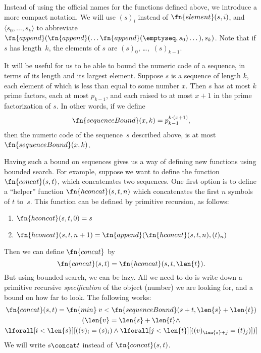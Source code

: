 \documentclass[../../include/open-logic-section]{subfiles}
\begin{document}
Instead of using the official names for the functions defined above,
we introduce a more compact notation.  We will use $(s)_i$ instead of
$\fn{element}(s,i)$, and $\langle s_0, \dots, s_k\rangle$ to abbreviate
$\fn{append}(\fn{append}(\dots \fn{append}(\emptyseq,s_0)
\dots),s_k)$. Note that if $s$ has length~$k$, the elements of $s$ are
$(s)_0$, \dots,~$(s)_{k-1}$.

It will be useful for us to be able to bound the numeric code of a
sequence, in terms of its length and its largest element. Suppose $s$
is a sequence of length $k$, each element of which is less than equal
to some number $x$. Then $s$ has at most $k$ prime factors, each at
most $p_{k-1}$, and each raised to at most $x+1$ in the prime
factorization of $s$. In other words, if we define
\[
\fn{sequenceBound}(x,k) = p_{k-1}^{k \cdot (x+1)},
\]
then the numeric code of the sequence~$s$ described above, is at
most~$\fn{sequenceBound}(x,k)$.

Having such a bound on sequences gives us a way of defining new
functions using bounded search. For example, suppose we want to
define the function $\fn{concat}(s,t)$, which concatenates two
sequences. One first option is to define a ``helper'' function
$\fn{hconcat}(s,t,n)$ which concatenates the first $n$ symbols of $t$
to~$s$. This function can be defined by primitive recursion, as
follows:
\begin{enumerate}
\item $\fn{hconcat}(s,t,0) = s$
\item $\fn{hconcat}(s,t,n+1) = \fn{append}(\fn{hconcat}(s,t,n),(t)_n)$
\end{enumerate}
Then we can define $\fn{concat}$ by 
\[
\fn{concat}(s,t) = \fn{hconcat}(s,t,\len{t}).
\]
But using bounded search, we can be lazy. All we need to do is write
down a primitive recursive \emph{specification} of the object (number)
we are looking for, and a bound on how far to look. The following works:
\begin{multline*}
  \fn{concat}(s,t) = \fn{min} \; {v < \fn{sequenceBound}(s+t,\len{s} +
    \len{t})} \\
  (\len{v} = \len{s} + \len{t} \land \\
  \lforall[i < \len{s}][((v)_i = (s)_i) \land \lforall[j <
    \len{t}][((v)_{\len{s}+j} = (t)_j)])]
\end{multline*}
We will write $s \concat t$ instead of $\fn{concat}(s,t)$.
\end{document}
